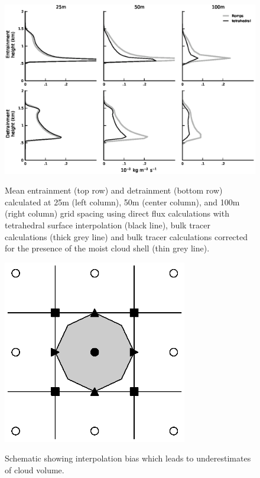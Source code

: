 \documentclass[12pt]{article}
\begin{document}
\begin{figure}[t]
  \noindent\includegraphics[width=40pc,angle=0]{./figures/resolution_dependence}\\
  \caption{Mean entrainment (top row) and detrainment (bottom row) calculated
at 25m (left column), 50m (center column), and 100m (right column) grid 
spacing using direct flux calculations with tetrahedral surface interpolation 
(black line), bulk tracer calculations (thick grey line) and bulk tracer 
calculations corrected for the presence of the moist cloud shell (thin grey 
line).}\label{fig:resolution_dependence}
\end{figure}

\begin{figure}[t]
  \noindent\includegraphics[width=19pc,angle=0]{./figures/interpolation_bias}\\ 
  \caption{Schematic showing interpolation bias which leads to underestimates
  of cloud volume.
  }\label{fig:interpolation_bias}
\end{figure}
\end{document}
